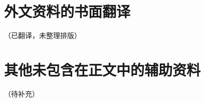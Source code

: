 \cleardoublepage

\chapter{外文资料的书面翻译}\label{sec:-a-trans}

（已翻译，未整理排版）

\chapter{其他未包含在正文中的辅助资料}\label{sec:-a-misc}

（待补充）
